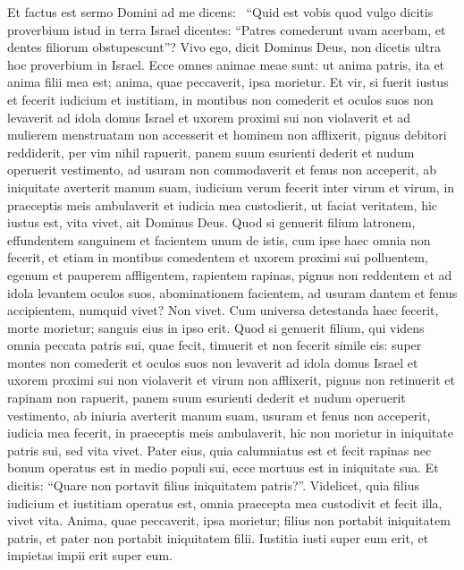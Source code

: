 \begin{biblechapter}  
\verse Et factus est sermo Domini ad me dicens:  
\verse “Quid est vobis quod vulgo dicitis proverbium istud in terra Israel dicentes: “Patres comederunt uvam acerbam, et dentes filiorum obstupescunt”? 
\verse Vivo ego, dicit Dominus Deus, non dicetis ultra hoc proverbium in Israel.  
\verse Ecce omnes animae meae sunt: ut anima patris, ita et anima filii mea est; anima, quae peccaverit, ipsa morietur. 
\verse Et vir, si fuerit iustus et fecerit iudicium et iustitiam, 
\verse in montibus non comederit et oculos suos non levaverit ad idola domus Israel et uxorem proximi sui non violaverit et ad mulierem menstruatam non accesserit 
\verse et hominem non afflixerit, pignus debitori reddiderit, per vim nihil rapuerit, panem suum esurienti dederit et nudum operuerit vestimento, 
\verse ad usuram non commodaverit et fenus non acceperit, ab iniquitate averterit manum suam, iudicium verum fecerit inter virum et virum, 
\verse in praeceptis meis ambulaverit et iudicia mea custodierit, ut faciat veritatem, hic iustus est, vita vivet, ait Dominus Deus. 
\verse Quod si genuerit filium latronem, effundentem sanguinem et facientem unum de istis, 
\verse cum ipse haec omnia non fecerit, et etiam in montibus comedentem et uxorem proximi sui polluentem, 
\verse egenum et pauperem affligentem, rapientem rapinas, pignus non reddentem et ad idola levantem oculos suos, abominationem facientem, 
\verse ad usuram dantem et fenus accipientem, numquid vivet? Non vivet. Cum universa detestanda haec fecerit, morte morietur; sanguis eius in ipso erit. 
\verse Quod si genuerit filium, qui videns omnia peccata patris sui, quae fecit, timuerit et non fecerit simile eis: 
\verse super montes non comederit et oculos suos non levaverit ad idola domus Israel et uxorem proximi sui non violaverit  
\verse et virum non afflixerit, pignus non retinuerit et rapinam non rapuerit, panem suum esurienti dederit et nudum operuerit vestimento, 
\verse ab iniuria averterit manum suam, usuram et fenus non acceperit, iudicia mea fecerit, in praeceptis meis ambulaverit, hic non morietur in iniquitate patris sui, sed vita vivet. 
\verse Pater eius, quia calumniatus est et fecit rapinas nec bonum operatus est in medio populi sui, ecce mortuus est in iniquitate sua. 
\verse Et dicitis: “Quare non portavit filius iniquitatem patris?”. Videlicet, quia filius iudicium et iustitiam operatus est, omnia praecepta mea custodivit et fecit illa, vivet vita. 
\verse Anima, quae peccaverit, ipsa morietur; filius non portabit iniquitatem patris, et pater non portabit iniquitatem filii. Iustitia iusti super eum erit, et impietas impii erit super eum. 

\end{biblechapter}
